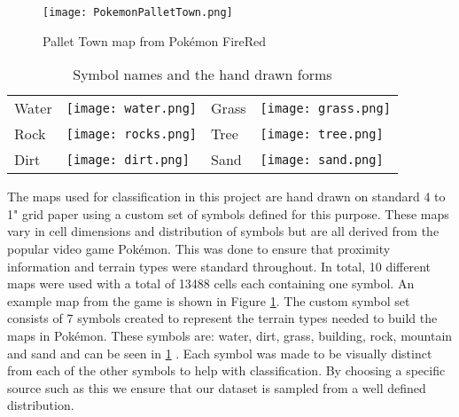 \begin{figure}[h]
\begin{center}
\texttt{[image: PokemonPalletTown.png]}
\end{center}
\caption{Pallet Town map from Pok\'{e}mon FireRed \cite{firered}}
\label{fig:pokemon}
\end{figure}

\begin{table}
\label{table:symbols}
\caption{Symbol names and the hand drawn forms}
\begin{center}
\begin{tabular}{llll}
Water & \texttt{[image: water.png]} &
Grass & \texttt{[image: grass.png]} \\
Rock & \texttt{[image: rocks.png]} &
Tree & \texttt{[image: tree.png]} \\
Dirt & \texttt{[image: dirt.png]} &
Sand & \texttt{[image: sand.png]} \\
\end{tabular}
\end{center}
\end{table}


The maps used for classification in this project are hand drawn on standard 4 to 1" grid paper using a custom set of symbols defined for this purpose. These maps vary in cell dimensions and distribution of symbols but are all derived from the popular video game Pok\'{e}mon. This was done to ensure that proximity information and terrain types were standard throughout. In total, 10 different maps were used with a total of 13488 cells each containing one symbol. An example map from the game is shown in Figure \ref{fig:pokemon}.  The custom symbol set consists of 7 symbols created to represent the terrain types needed to build the maps in Pok\'{e}mon. These symbols are: water, dirt, grass, building, rock, mountain and sand and can be seen in \ref{table:symbols} . Each symbol was made to be visually distinct from each of the other symbols to help with classification. By choosing a specific source such as this we ensure that our dataset is sampled from a well defined distribution.


